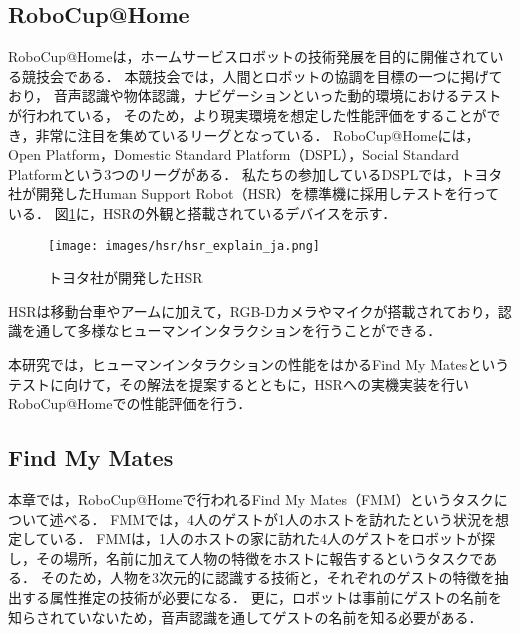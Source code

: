 \documentclass[a4j]{jarticle}
\begin{document}
\subsection{RoboCup@Home}
RoboCup@Homeは，ホームサービスロボットの技術発展を目的に開催されている競技会である．
本競技会では，人間とロボットの協調を目標の一つに掲げており，
音声認識や物体認識，ナビゲーションといった動的環境におけるテストが行われている，
そのため，より現実環境を想定した性能評価をすることができ，非常に注目を集めているリーグとなっている．
RoboCup@Homeには，Open Platform，Domestic Standard Platform（DSPL），Social Standard Platformという3つのリーグがある．
私たちの参加しているDSPLでは，トヨタ社が開発したHuman Support Robot（HSR）を標準機に採用しテストを行っている．
図\ref{overview_hsr}に，HSRの外観と搭載されているデバイスを示す．
\begin{figure}[ht]
  \centering
  \texttt{[image: images/hsr/hsr\_explain\_ja.png]}
  \caption{トヨタ社が開発したHSR}
  \label{overview_hsr}
\end{figure}
HSRは移動台車やアームに加えて，RGB-Dカメラやマイクが搭載されており，認識を通して多様なヒューマンインタラクションを行うことができる．

本研究では，ヒューマンインタラクションの性能をはかるFind My Matesというテストに向けて，その解法を提案するとともに，HSRへの実機実装を行いRoboCup@Homeでの性能評価を行う．

\subsection{Find My Mates}
本章では，RoboCup@Homeで行われるFind My Mates（FMM）というタスクについて述べる．
FMMでは，4人のゲストが1人のホストを訪れたという状況を想定している．
FMMは，1人のホストの家に訪れた4人のゲストをロボットが探し，その場所，名前に加えて人物の特徴をホストに報告するというタスクである．
そのため，人物を3次元的に認識する技術と，それぞれのゲストの特徴を抽出する属性推定の技術が必要になる．
更に，ロボットは事前にゲストの名前を知らされていないため，音声認識を通してゲストの名前を知る必要がある．
\end{document}
